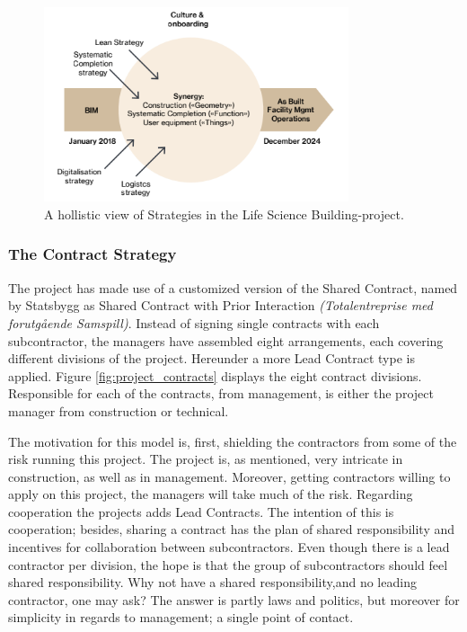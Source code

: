 \begin{figure}
    \centering
    \includegraphics[width=0.8\textwidth]{fig/LVB_strategy.png}
    \caption{A hollistic view of Strategies in the Life Science Building-project.}
    \label{fig:strategy}
\end{figure}

\subsubsection*{The Contract Strategy}
The project has made use of a customized version of the Shared Contract, named by Statsbygg as Shared Contract with Prior Interaction \textit{(Totalentreprise med forutgående Samspill)}. Instead of signing single contracts with each subcontractor, the managers have assembled eight arrangements, each covering different divisions of the project. Hereunder a more Lead Contract type is applied. Figure \ref{fig:project_contracts} displays the eight contract divisions. Responsible for each of the contracts, from management, is either the project manager from construction or technical. 

The motivation for this model is, first, shielding the contractors from some of the risk running this project. The project is, as mentioned, very intricate in construction, as well as in management. Moreover, getting contractors willing to apply on this project, the managers will take much of the risk. Regarding cooperation the projects adds Lead Contracts. The intention of this is cooperation; besides, sharing a contract has the plan of shared responsibility and incentives for collaboration between subcontractors. Even though there is a lead contractor per division, the hope is that the group of subcontractors should feel shared responsibility. Why not have a shared responsibility,and no leading contractor, one may ask? The answer is partly laws and politics, but moreover for simplicity in regards to management; a single point of contact.

